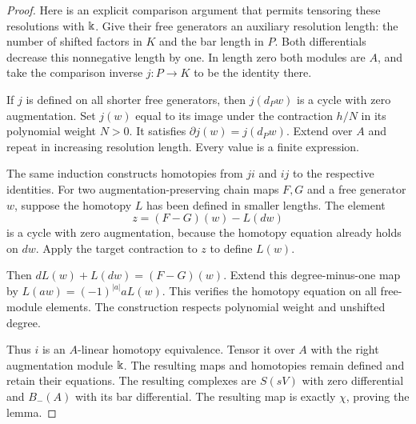 \begin{proof}
Here is an explicit comparison argument that permits tensoring
these resolutions with $\Bbbk$.
Give their free generators an auxiliary resolution length:
the number of shifted factors in $K$ and the bar length in $P$.
Both differentials decrease this nonnegative length by one.
In length zero both modules are $A$, and take the comparison
inverse $j:P\to K$ to be the identity there.

If $j$ is defined on all shorter free generators, then
$j(d_Pw)$ is a cycle with zero augmentation.
Set $j(w)$ equal to its image under the contraction $h/N$
in its polynomial weight $N>0$.
It satisfies $\partial j(w)=j(d_Pw)$.
Extend over $A$ and repeat in increasing resolution length.
Every value is a finite expression.

The same induction constructs homotopies from $ji$ and $ij$
to the respective identities.
For two augmentation-preserving chain maps $F,G$ and a free
generator $w$, suppose the homotopy $L$ has been defined in
smaller lengths.
The element
\[
 z=(F-G)(w)-L(dw)
\]
is a cycle with zero augmentation, because the homotopy
equation already holds on $dw$.
Apply the target contraction to $z$ to define $L(w)$.

Then $dL(w)+L(dw)=(F-G)(w)$.
Extend this degree-minus-one map by
$L(aw)=(-1)^{|a|}aL(w)$.
This verifies the homotopy equation on all free-module elements.
The construction respects polynomial weight and unshifted degree.

Thus $i$ is an $A$-linear homotopy equivalence.
Tensor it over $A$ with the right augmentation module $\Bbbk$.
The resulting maps and homotopies remain defined and retain
their equations.  The resulting complexes are $S(sV)$ with
zero differential and $B_-(A)$ with its bar differential.
The resulting map is exactly $\chi$, proving the lemma.
\end{proof}

